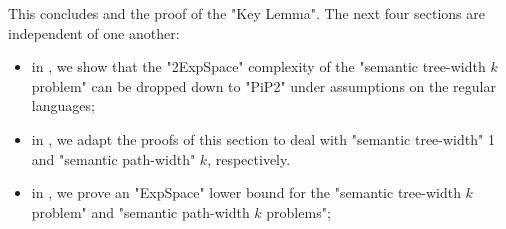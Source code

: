 This concludes  and the proof of the "Key Lemma".
The next four sections are independent of one another:
\begin{itemize}
	\item in , we show that the "2ExpSpace" complexity
	of the "semantic tree-width $k$ problem" can be dropped down to
	"PiP2" under assumptions on the regular languages;
	\item in , we adapt
	the proofs of this section to deal with
	"semantic tree-width" 1 and "semantic path-width" $k$, respectively.
	\item in , we prove an "ExpSpace" lower bound for the
	"semantic tree-width $k$ problem" and "semantic path-width $k$ problems";
\end{itemize}

